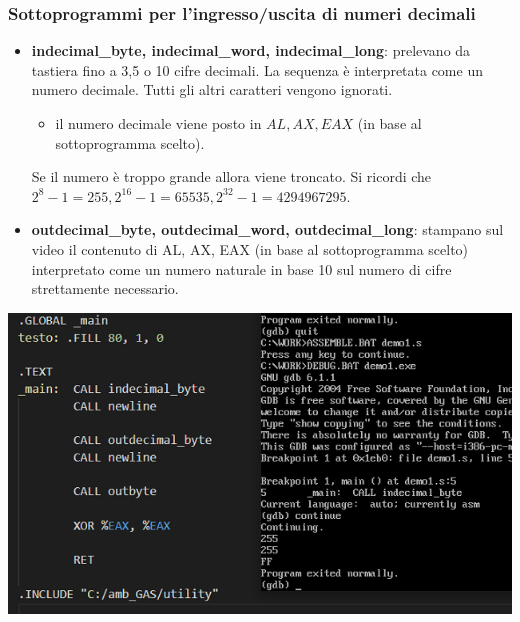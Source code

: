 \documentclass[11pt]{report}
\begin{document}
\subsubsection{Sottoprogrammi per l'ingresso/uscita di numeri decimali}
\begin{itemize}
\item \textbf{indecimal\_byte, indecimal\_word, indecimal\_long}: prelevano da tastiera fino a 3,5 o 10 cifre decimali. La sequenza è interpretata come un numero decimale. Tutti gli altri caratteri vengono ignorati. 
\begin{itemize}
\item il numero decimale viene posto in $AL, AX, EAX$ (in base al sottoprogramma scelto).
\end{itemize}
Se il numero è troppo grande allora viene troncato. Si ricordi che\\$2^8-1=255, 2^{16}-1=65535, 2^{32}-1=4294967295$.
\item \textbf{outdecimal\_byte, outdecimal\_word, outdecimal\_long}:  stampano sul video il contenuto di AL, AX, EAX (in base al sottoprogramma scelto) interpretato come un numero naturale in base 10 sul numero di cifre strettamente necessario.
\end{itemize}

\begin{center}
\includegraphics{img/222.PNG}
\end{center}
\clearpage
\end{document}
